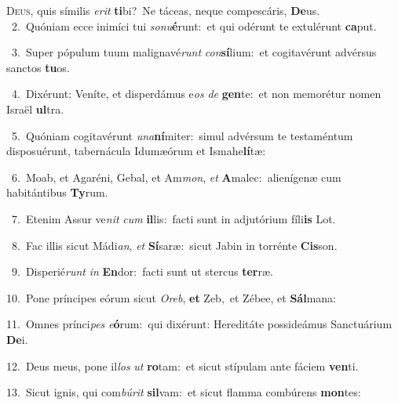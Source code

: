 \lettrine{\initial\textcolor{\initialcolor}{D}}{eus,} quis símilis \textit{e}\-\textit{rit} \textbf{ti}\-bi?~\star Ne táceas, neque compescáris, \textbf{De}\-us.\\
{\numbfont\textcolor{\numbcolor}{~2.}}~Quóniam ecce inimíci tui \textit{so}\-\textit{nu}\textbf{é}runt:~\star et qui odérunt te extulérunt \textbf{ca}\-put.\par
{\numbfont\textcolor{\numbcolor}{~3.}}~Super pópulum tuum malignavé\textit{runt} \textit{con}\-\textbf{sí}lium:~\star et cogitavérunt advérsus sanctos \textbf{tu}\-os.\par
{\numbfont\textcolor{\numbcolor}{~4.}}~Dixérunt: Veníte, et disperdámus e\textit{os} \textit{de} \textbf{gen}\-te:~\star et non memorétur nomen Israël \textbf{ul}\-tra.\par
{\numbfont\textcolor{\numbcolor}{~5.}}~Quóniam cogitavérunt \textit{u}\-\textit{na}\textbf{ní}miter:~\star simul advérsum te testaméntum disposuérunt, tabernácula Idumæórum et Ismahe\-\textbf{lí}\-tæ:\par
{\numbfont\textcolor{\numbcolor}{~6.}}~Moab, et Agaréni, Gebal, et Am\-\textit{mon}\-, \textit{et} \textbf{A}\-malec:~\star alienígenæ cum habitántibus \textbf{Ty}\-rum.\par
{\numbfont\textcolor{\numbcolor}{~7.}}~Etenim Assur ve\textit{nit} \textit{cum} \textbf{il}\-lis:~\star facti sunt in adjutórium fíli\textbf{is} Lot.\par
{\numbfont\textcolor{\numbcolor}{~8.}}~Fac illis sicut Mádi\-\textit{an}\-, \textit{et} \textbf{Sí}\-saræ:~\star sicut Jabin in torrénte \textbf{Cis}\-son.\par
{\numbfont\textcolor{\numbcolor}{~9.}}~Disperié\textit{runt} \textit{in} \textbf{En}\-dor:~\star facti sunt ut stercus \textbf{ter}\-ræ.\par
{\numbfont\textcolor{\numbcolor}{10.}}~Pone príncipes eórum sicut \textit{O}\-\textit{reb}, \textbf{et} Zeb,~\star et Zébee, et \textbf{Sál}\-mana:\par
{\numbfont\textcolor{\numbcolor}{11.}}~Omnes prínci\textit{pes} \textit{e}\-\textbf{ó}rum:~\star qui dixérunt: Hereditáte possideámus Sanctuárium \textbf{De}\-i.\par
{\numbfont\textcolor{\numbcolor}{12.}}~Deus meus, pone il\textit{los} \textit{ut} \textbf{ro}\-tam:~\star et sicut stípulam ante fáciem \textbf{ven}\-ti.\par
{\numbfont\textcolor{\numbcolor}{13.}}~Sicut ignis, qui com\-\textit{bú}\-\textit{rit} \textbf{sil}\-vam:~\star et sicut flamma combúrens \textbf{mon}\-tes:\par
